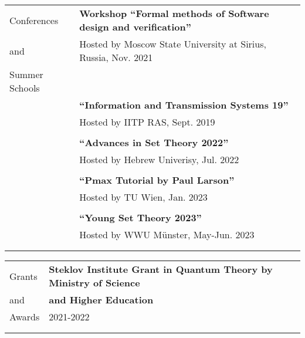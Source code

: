 \documentclass[letterpaper,11pt,oneside]{article}
\begin{document}
\begin{tabular}{p{4cm} p{15cm}}

    \Large{Conferences} & \textbf{Workshop ``Formal methods of Software design and verification''} \\
    \Large{and}   & Hosted by Moscow State University at Sirius, Russia, Nov. 2021\\
    \Large{Summer Schools}   & \\
        & \textbf{``Information and Transmission Systems 19'' } \\
        & Hosted by IITP RAS, Sept. 2019 \\
        \\
        & \textbf{``Advances in Set Theory 2022'' } \\
        & Hosted by Hebrew Univerisy, Jul. 2022 \\
        \\
        & \textbf{``Pmax Tutorial by Paul Larson'' } \\
        & Hosted by TU Wien, Jan. 2023 \\
        \\
        & \textbf{``Young Set Theory 2023'' } \\
        & Hosted by WWU Münster, May-Jun. 2023 \\
        \\\\
    \end{tabular}
    \begin{tabular}{p{4cm} p{15cm}}
    \Large{Grants}  & \textbf{Steklov Institute Grant in Quantum Theory by Ministry of Science  } \\
    \Large{and}      & \textbf{and Higher Education} \\
      \Large{Awards}  & 2021-2022 \\
        \\\\
    \end{tabular}
\end{document}
